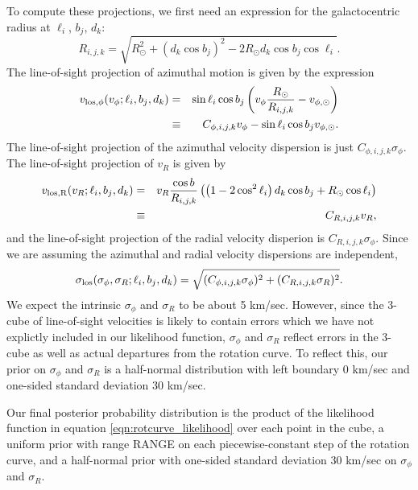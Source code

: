 To compute these projections, we first need an expression for the galactocentric radius at $\ell_i$, $b_j$, $d_k$:
\begin{equation}
\label{eqn:radius}
    R_{i,j,k} = \sqrt{ R_\odot^2 + (d_k \cos b_j)^2 - 2 R_\odot d_k \cos b_j \cos \ell_i}.
\end{equation}
The line-of-sight projection of azimuthal motion is given by the expression
\begin{eqnarray}
\label{eqn:velo-los-phi}
    v_{\rm{los}, \phi}(v_\phi; \ell_i, b_j, d_k) &=& \sin \ell_i \cos b_j  \left( v_\phi \frac{R_\odot}{R_{i,j,k}} - v_{\phi, \odot} \right)\\
    &\equiv& C_{\phi,i,j,k} v_\phi - \sin \ell_i \cos b_j v_{\phi, \odot}.
\end{eqnarray}
The line-of-sight projection of the azimuthal velocity dispersion is just $C_{\phi,i,j,k} \sigma_\phi$. The line-of-sight projection of $v_R$ is given  by 
\begin{eqnarray}
\label{eqn:velo-los-radial}
    v_{\rm{los}, R} (v_R; \ell_i,  b_j, d_k) &=& v_R \frac{\cos b}{R_{i,j,k}} \left( \left( 1 - 2 \cos^2 \ell_i \right) d_k \cos b_j + R_\odot \cos \ell_i \right)\\
    &\equiv& C_{R,i,j,k} v_R,
\end{eqnarray}
and the line-of-sight projection of the radial velocity disperion is $C_{R,i,j,k} \sigma_\phi$. Since we are assuming the azimuthal and radial velocity dispersions are independent,
\begin{equation}
\label{eqn:velo-los-dispersion}
    \sigma_{\rm{los}} (\sigma_\phi, \sigma_R; \ell_i, b_j, d_k) = \sqrt{ (C_{\phi,i,j,k} \sigma_\phi)^2 + (C_{R,i,j,k} \sigma_R)^2 }.
\end{equation}
We expect the intrinsic $\sigma_\phi$ and $\sigma_R$ to be about 5 km/sec. However, since the 3-cube of line-of-sight velocities is likely to contain errors which we have not explictly included in our likelihood function, $\sigma_\phi$ and $\sigma_R$ reflect errors in the 3-cube as well as actual departures from the rotation curve. To reflect this, our prior on $\sigma_\phi$ and $\sigma_R$ is a half-normal distribution with left boundary 0 km/sec and one-sided standard deviation 30 km/sec. 

Our final posterior probability distribution is the product of the likelihood function in equation \ref{eqn:rotcurve_likelihood} over each point in the cube, a uniform prior with range RANGE on each piecewise-constant step of the rotation curve, and a half-normal prior with one-sided standard deviation 30 km/sec on $\sigma_\phi$ and $\sigma_R$. 
